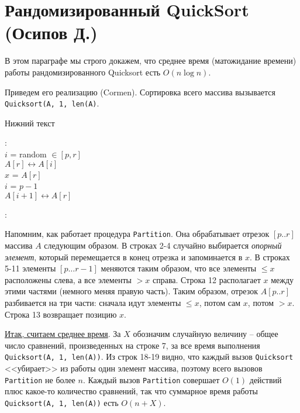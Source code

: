 \section{Рандомизированный QuickSort (Осипов Д.)}

В этом параграфе мы строго докажем, что среднее время (матожидание времени) работы рандомизированного Quicksort есть $O(n\log n)$.

Приведем его реализацию (Cormen). Сортировка всего массива вызывается \texttt{Quicksort(A, 1, len(A)}.

\LinesNumbered
\begin{algorithm}[H]
\caption{Нижний текст}
:\\
$i$ = random $\in [p, r]$\\
$A[r] \leftrightarrow A[i]$\\
$x$ = $A[r]$ \\
$i$ = $p-1$ \\
$A[i+1] \leftrightarrow A[r]$\\

$ $\\

: \\
\end{algorithm}

Напомним, как работает процедура \texttt{Partition}. Она обрабатывает отрезок $[p..r]$ массива $A$ следующим образом.  В строках 2-4 случайно выбирается \textit{опорный элемент}, который перемещается в конец отрезка и запоминается в $x$. В строках 5-11 элементы $[p\ldots r-1]$ меняются таким образом, что все элементы $\leq x$ расположены слева, а все элементы $> x$ справа. Строка 12 располагает $x$ между этими частями (немного меняя правую часть). Таким образом, отрезок $A[p..r]$ разбивается на три части: сначала идут элементы $\leq x$, потом сам $x$, потом $> x$. Строка 13 возвращает позицию $x$.

\underline{Итак, считаем среднее время}. За $X$ обозначим случайную величину -- общее число сравнений, произведенных на строке 7, за все время выполнения \texttt{Quicksort(A, 1, len(A))}. Из строк 18-19 видно, что каждый вызов \texttt{Quicksort} <<убирает>> из работы один элемент массива, поэтому всего вызовов \texttt{Partition} не более $n$. Каждый вызов \texttt{Partition} совершает $O(1)$ действий плюс какое-то количество сравнений, так что суммарное время работы \texttt{Quicksort(A, 1, len(A))} есть $O(n+X)$.

